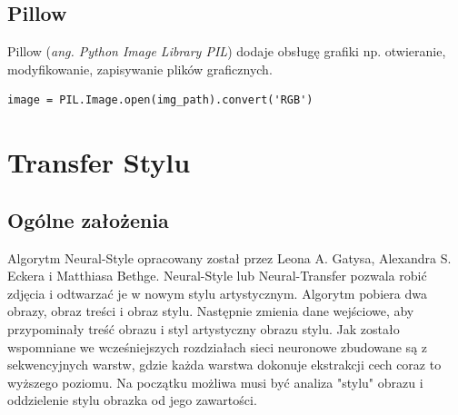 \documentclass[openright]{xmgr}
\begin{document}
\section{Pillow\label{s:dsssl}}
    
  \indent \indent  Pillow (\textit{ang. Python Image Library PIL}) dodaje obsługę grafiki np. otwieranie, modyfikowanie, zapisywanie plików graficznych.
   
\begin{lstlisting}
image = PIL.Image.open(img_path).convert('RGB')
\end{lstlisting}
   
    


\chapter{Transfer Stylu }

\section{Ogólne założenia\label{s:dsssl}}

  \indent \indent Algorytm Neural-Style opracowany został przez Leona A. Gatysa, Alexandra S. Eckera i Matthiasa Bethge. Neural-Style lub Neural-Transfer pozwala robić zdjęcia i odtwarzać je w nowym stylu artystycznym. Algorytm pobiera dwa obrazy, obraz treści i obraz stylu. Następnie zmienia dane wejściowe, aby przypominały treść obrazu i styl artystyczny obrazu stylu. Jak zostało wspomniane we wcześniejszych rozdziałach sieci neuronowe zbudowane są z sekwencyjnych warstw, gdzie każda warstwa dokonuje ekstrakcji cech coraz to wyższego poziomu. Na początku możliwa musi być analiza "stylu" obrazu i oddzielenie stylu obrazka od jego zawartości. 
  
\end{document}

